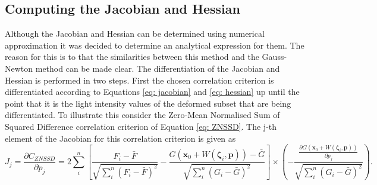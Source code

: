 \documentclass[12pt,oneside,openany,a4paper, %
english, %
masters-t, goldenblock]{usthesis}
\newcommand*\mean[1]{\bar{#1}} %
\begin{document}



\subsection{Computing the Jacobian and Hessian}
Although the Jacobian and Hessian can be determined using numerical approximation it was decided to determine an analytical expression for them.
The reason for this is to that the similarities between this method and the Gauss-Newton method can be made clear.
The differentiation of the Jacobian and Hessian is performed in two steps. First the chosen correlation criterion is differentiated according to Equations \ref{eq: jacobian} and \ref{eq: hessian} up until the point that it is the light intensity values of the deformed subset that are being differentiated. To illustrate this consider the Zero-Mean Normalised Sum of Squared Difference correlation criterion of Equation \ref{eq: ZNSSD}. The j-th element of the Jacobian for this correlation criterion is given as
\begin{equation}
\label{eq: jacobian hand}
  J_j=\frac{\partial C_{ZNSSD}}{\partial p_j} = 2 \sum_i^n \left[ \frac{F_i-\mean{F}}{\sqrt{\sum_i^n (F_i-\mean{F})^2}} - \frac{G(\bm{x}_0 + W(\bm{\zeta}_i, \bm{p}))-\mean{G}}{\sqrt{\sum_i^n (G_i-\mean{G})^2}} \right] \times \left( -\frac{\frac{\partial G(\bm{x}_0 + W(\bm{\zeta}_i, \bm{p}))}{\partial p_j}}{\sqrt{\sum_i^n (G_i-\mean{G})^2}} \right).
\end{equation}
\end{document}
